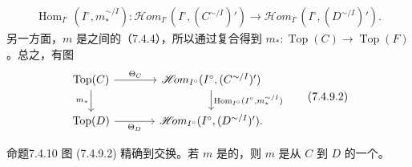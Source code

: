 \[\begin{aligned}
\operatorname{Hom}_{I^\circ}(I^\circ,m_*^{\sim/I}):\mathscr{H}\!om_{I^\circ}(I^\circ,(C^{\sim/I})')
\longrightarrow\mathscr{H}\!om_{I^\circ}(I^\circ,(D^{\sim/I})').
\end{aligned}\tag{7.4.9.1}\]
另一方面，$m$ 是之间的（7.4.4），所以通过复合得到 $m_*:\operatorname{Top}(C)\to\operatorname{Top}(F)$。总之，有图
\[\begin{tikzcd}[column sep=large]
\operatorname{Top}(C)\arrow[r,"\Theta_C"]\arrow[d,"m_*"']&\mathscr{H}\!om_{I^\circ}(I^\circ,(C^{\sim/I})')\arrow[d,"{\operatorname{Hom}_{I^\circ}(I^\circ,m_*^{\sim/I})}"]\\
\operatorname{Top}(D)\arrow[r,"\Theta_D"']&\mathscr{H}\!om_{I^\circ}(I^\circ,(D^{\sim/I})').
\end{tikzcd}\tag{7.4.9.2}\]
\begin{SGAresult}{命题}{7.4.10}
图 (7.4.9.2) 精确到交换。若 $m$ 是的，则 $m$ 是从 $C$ 到 $D$ 的一个。
\end{SGAresult}
